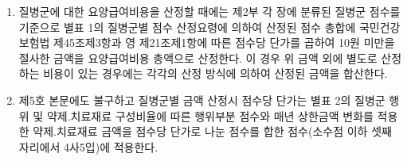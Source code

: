\begin{enumerate}[1.]
\begin{enumerate}[가.]
	\item 요양급여기준 제8조제2항의 규정에 의하여 고시된 약제 급여 목록 및 급여 상한금액표의 약제와 치료재료 급여.비급여 목록 및 급여 상한 금액표의 치료재료
	\item 요양급여기준 별표 2의 비급여대상 중 제6호의 비급여대상을 제외한 행위.약제 및 치료재료
	\item 국민건강보험법 시행규칙 별표 6의 본인이 요양급여비용의 100분의 100을 부담하는 항목 중 제1호 자목에 해당하는 항목을 제외한 행위\cntrdot{}약제 및 치료재료
	\item 다음 항목 중 위 가목 내지 라목에 해당하는 경우
		\begin{enumerate}[(1)]\tightlist
		\item 요양급여기준 별표 1 제1호 마목에서 장관이 정하는 바에 따라
다른 기관에 검사를 위탁하거나 당해 요양기관에 소속되지 아니한
전문성이 뛰어난 의료인을 초빙하거나, 또는 다른 요양기관에서
보유하고 있는 양질의 시설.인력 및 장비를 공동 사용하는 경우
소요되는 행위.약제 및 치료재료
		\item 입.퇴원 당일에 발생한 행위.약제 및 치료재료로써 외래진료 및 퇴원약제 등을 포함하되 다음 항목은 제외한다.
			\begin{enumerate}[(가)]\tightlist
			\item  질병군 입원을 예견하지 못한 상태에서 입원 당일 외래진료를 받은 경우의 원외처방 약제비
			\item 질병군으로 퇴원 후 질병군과 관계없는 상병으로 퇴원 당일 외래진료를 받은 경우의 원외처방 약제비
			\item 질병군으로 퇴원 후 질병군 질환과 관계없는 상병으로 퇴원 당일 재입원하는 경우의 요양급여비용
			\end{enumerate}
		\item 요양기관의 요구에 의하여 가입자 등이 외부에서 직접 구입한 약제 및 치료재료
		\end{enumerate}
	\end{enumerate}
\item 질병군에 대한 요양급여비용을 산정할 때에는 제2부 각 장에 분류된 질병군 점수를 기준으로 별표 1의 질병군별 점수 산정요령에 의하여 산정된 점수 총합에 국민건강보험법 제45조제3항과 영 제21조제1항에 따른 점수당 단가를 곱하여 10원 미만을 절사한 금액을 요양급여비용 총액으로 산정한다. 이 경우 위 금액 외에 별도로 산정하는 비용이 있는 경우에는 각각의 산정 방식에 의하여 산정된 금액을 합산한다.
\item 제5호 본문에도 불구하고 질병군별 금액 산정시 점수당 단가는 별표 2의 질병군 행위 및 약제.치료재료 구성비율에 따른 행위부분 점수와 매년 상한금액 변화를 적용한 약제.치료재료 금액을 점수당 단가로 나눈 점수를 합한 점수(소수점 이하 셋째 자리에서 4사5입)에 적용한다.\\

\end{enumerate}
